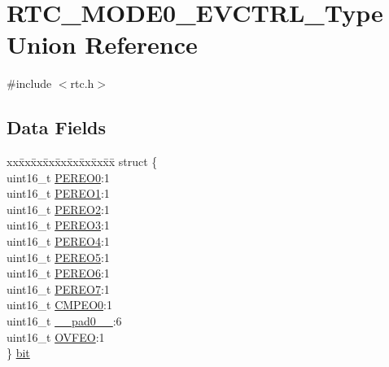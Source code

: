 \hypertarget{union_r_t_c___m_o_d_e0___e_v_c_t_r_l___type}{}\section{R\+T\+C\+\_\+\+M\+O\+D\+E0\+\_\+\+E\+V\+C\+T\+R\+L\+\_\+\+Type Union Reference}
\label{union_r_t_c___m_o_d_e0___e_v_c_t_r_l___type}


{\ttfamily \#include $<$rtc.\+h$>$}

\subsection*{Data Fields}
\begin{DoxyCompactItemize}
\item 
\begin{tabbing}
xx\=xx\=xx\=xx\=xx\=xx\=xx\=xx\=xx\=\kill
struct \{\\
\>uint16\_t \mbox{\hyperlink{union_r_t_c___m_o_d_e0___e_v_c_t_r_l___type_a038cf8cfc1288382b89f2a9eb8dc61d1}{PEREO0}}:1\\
\>uint16\_t \mbox{\hyperlink{union_r_t_c___m_o_d_e0___e_v_c_t_r_l___type_a5d14d8ffdf50889eaf20c044b17d5e93}{PEREO1}}:1\\
\>uint16\_t \mbox{\hyperlink{union_r_t_c___m_o_d_e0___e_v_c_t_r_l___type_a97880ca3fc48b61978115b9b2ccbe83f}{PEREO2}}:1\\
\>uint16\_t \mbox{\hyperlink{union_r_t_c___m_o_d_e0___e_v_c_t_r_l___type_a5c520f909edfd0b7aac696401e7dd0b6}{PEREO3}}:1\\
\>uint16\_t \mbox{\hyperlink{union_r_t_c___m_o_d_e0___e_v_c_t_r_l___type_a586ce89832afa164a4f8e2964b85e939}{PEREO4}}:1\\
\>uint16\_t \mbox{\hyperlink{union_r_t_c___m_o_d_e0___e_v_c_t_r_l___type_a5b9fe3e4351dadf30cc294f6fb3005e9}{PEREO5}}:1\\
\>uint16\_t \mbox{\hyperlink{union_r_t_c___m_o_d_e0___e_v_c_t_r_l___type_a08cf324e465c485498d57c5746df14b7}{PEREO6}}:1\\
\>uint16\_t \mbox{\hyperlink{union_r_t_c___m_o_d_e0___e_v_c_t_r_l___type_a0118b512cae84cadf15a886f3e7a39b6}{PEREO7}}:1\\
\>uint16\_t \mbox{\hyperlink{union_r_t_c___m_o_d_e0___e_v_c_t_r_l___type_aba8e5ae30e06c023cae87e8ceb1dbc19}{CMPEO0}}:1\\
\>uint16\_t \mbox{\hyperlink{union_r_t_c___m_o_d_e0___e_v_c_t_r_l___type_a77132c2c26a75f5b8751b235cda23828}{\_\_pad0\_\_}}:6\\
\>uint16\_t \mbox{\hyperlink{union_r_t_c___m_o_d_e0___e_v_c_t_r_l___type_ad5675910f0a67704471b8e7f6ea2014e}{OVFEO}}:1\\
\} \mbox{\hyperlink{union_r_t_c___m_o_d_e0___e_v_c_t_r_l___type_a1ac54aab70de9fc9d437dabe56781b3b}{bit}}\\


\end{tabbing}
\end{DoxyCompactItemize}
